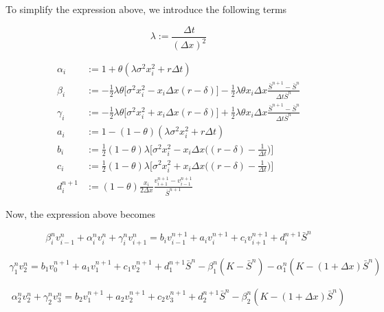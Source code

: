 To simplify the expression above, we introduce the following terms

\begin{equation}
    \lambda := \frac{\Delta t}{(\Delta x)^2}
\end{equation}

\begin{align}
    \alpha_i &:= 1 + \theta (\lambda \sigma^2 x_{i}^{2} + r{\Delta t}) \\
    \beta_i &:= - \frac{1}{2} \lambda \theta \bigg[ \sigma^{2} x_{i}^{2} - x_i \Delta x (r - \delta) \bigg]  - \frac{1}{2} \lambda \theta   x_i \Delta x \frac{\bar{S}^{n+1} - \bar{S}^{n}}{\Delta t \bar{S}^n}  \\
    \gamma_i &:= -\frac{1}{2} \lambda \theta \bigg[ \sigma^{2} x_{i}^{2} + x_i \Delta x (r - \delta) \bigg]  + \frac{1}{2} \lambda \theta  x_i \Delta x  \frac{\bar{S}^{n+1} - \bar{S}^{n}}{\Delta t \bar{S}^n}\\
    a_i &:= 1 - (1-\theta) (\lambda \sigma^2 x_{i}^{2} +  r{\Delta t}) \\
    b_i &:= \frac{1}{2} (1-\theta) \lambda \bigg[\sigma^{2} x_{i}^{2} - x_i \Delta x \bigg( (r - \delta) - \frac{1}{\Delta t} \bigg) \bigg] \\
    c_i &:= \frac{1}{2} (1-\theta) \lambda \bigg[ \sigma^{2} x_{i}^{2} +  x_i \Delta x \bigg( (r - \delta) - \frac{1}{\Delta t} \bigg) \bigg] \\
    d^{n+1}_i &:= (1-\theta) \frac{x_i}{2 \Delta x}  \frac{v^{n+1}_{i+1} - v^{n+1}_{i-1}}{\bar{S}^{n+1}}
\end{align}

Now, the expression above becomes

\begin{equation}
    \beta^{n}_{i} v^{n}_{i-1} + \alpha^{n}_{i} v^{n}_{i} + \gamma^{n}_{i} v^{n}_{i+1} = b_i v^{n+1}_{i-1} + a_i v^{n+1}_{i} + c_i v^{n+1}_{i+1} + d^{n+1}_{i}\bar{S}^{n}
\end{equation}

\begin{align}
    \gamma^{n}_{1} v^{n}_{2} = b_1 v^{n+1}_{0} + a_1 v^{n+1}_{1} + c_1 v^{n+1}_{2} + d^{n+1}_{1}\bar{S}^{n} - \beta^{n}_{1} (K - \bar{S}^n) - \alpha^{n}_{1} (K - (1+\Delta x)\bar{S}^n) 
\end{align}

\begin{equation}
    \alpha^{n}_{2} v^{n}_{2} + \gamma^{n}_{2} v^{n}_{3} = b_2 v^{n+1}_{1} + a_2 v^{n+1}_{2} + c_2 v^{n+1}_{3} + d^{n+1}_{2}\bar{S}^{n} - \beta^{n}_{2} (K - (1+\Delta x)\bar{S}^n) 
\end{equation}

